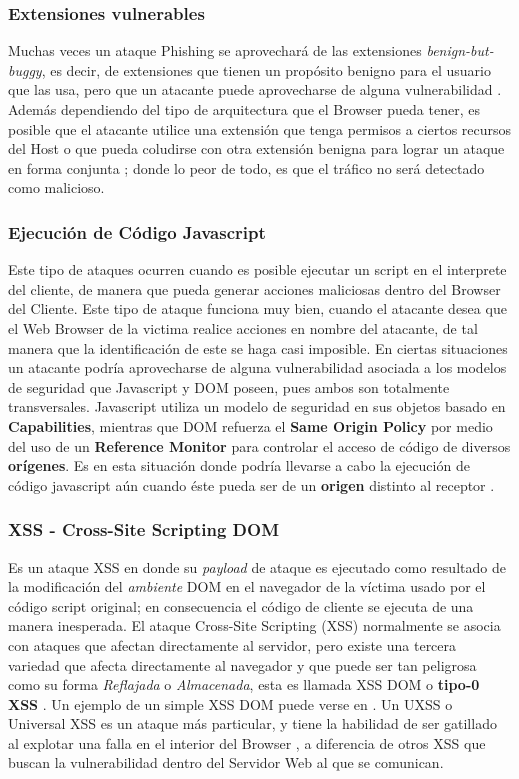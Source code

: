 	\subsubsection{Extensiones vulnerables}
	Muchas veces un ataque Phishing se aprovechará de las extensiones \textit{benign-but-buggy}, es decir, de extensiones que tienen un propósito benigno para el usuario que las usa, pero que un atacante puede aprovecharse de alguna vulnerabilidad \cite{Barth2010, Liu2012}. Además dependiendo del tipo de arquitectura que el Browser pueda tener, es posible que el atacante utilice una extensión que tenga permisos a ciertos recursos del Host o que pueda coludirse con otra extensión benigna para lograr un ataque en forma conjunta \cite{Saini2014}; donde lo peor de todo, es que el tráfico no será detectado como malicioso.

	\subsubsection{Ejecución de Código Javascript}
    Este tipo de ataques ocurren cuando es posible ejecutar un script en el interprete del cliente, de manera que pueda generar acciones maliciosas dentro del Browser del Cliente. Este tipo de ataque funciona muy bien, cuando el atacante desea que el Web Browser de la victima realice acciones en nombre del atacante, de tal manera que la identificación de este se haga casi imposible. En ciertas situaciones un atacante podría aprovecharse de alguna vulnerabilidad asociada a los modelos de seguridad que Javascript y DOM poseen, pues ambos son totalmente transversales. Javascript utiliza un modelo de seguridad en sus objetos basado en \textbf{Capabilities}, mientras que DOM refuerza el \textbf{Same Origin Policy} por medio del uso de un \textbf{Reference Monitor} para controlar el acceso de código de diversos \textbf{orígenes}. Es en esta situación donde podría llevarse a cabo la ejecución de código javascript aún cuando éste pueda ser de un \textbf{origen} distinto al receptor \cite{Barth2009}.

	\subsubsection{XSS - Cross-Site Scripting DOM}
	Es un ataque XSS en donde su \textit{payload} de ataque es ejecutado como resultado de la modificación del \textit{ambiente} DOM en el navegador de la víctima usado por el código script original; en consecuencia el código de cliente se ejecuta de una manera inesperada. El ataque Cross-Site Scripting (XSS) normalmente se asocia con ataques que afectan directamente al servidor, pero existe una tercera variedad que afecta directamente al navegador \cite{Singh2014} y que puede ser tan peligrosa como su forma \textit{Reflajada} o \textit{Almacenada}, esta es llamada XSS DOM o \textbf{tipo-0 XSS} \cite{XSSDOMOwasp, XSSDOM}. Un ejemplo de un simple XSS DOM puede verse en \cite{bugzillaXSSDOM}. Un UXSS o Universal XSS es un ataque más particular, y tiene la habilidad de ser gatillado al explotar una falla en el interior del Browser \cite{Paola2006}, a diferencia de otros XSS que buscan la vulnerabilidad dentro del Servidor Web al que se comunican.


